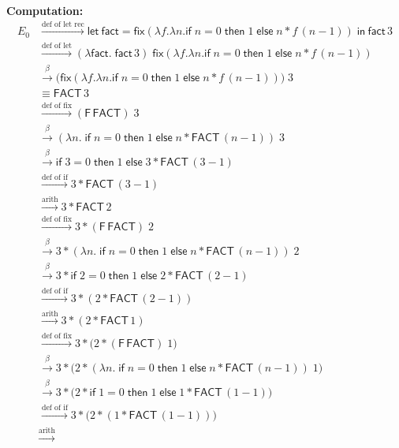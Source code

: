 \documentclass{article}
\theoremstyle{theorem}
\theoremstyle{definition}
\theoremstyle{remark}
\begin{document}
\textbf{Computation:} 
\begingroup
\setlength{\jot}{4pt}
\begin{align*}
E_0
&\xrightarrow{\text{def of let rec}}
\mathsf{let\ fact} = \mathsf{fix}(\lambda f.\lambda n.\mathsf{if}\;n=0\;\mathsf{then}\;1\;\mathsf{else}\;n * f\,(n-1))\;\mathsf{in\ fact}\,3\\
&\xrightarrow{\text{def of let}}
(\lambda \mathsf{fact}.\; \mathsf{fact}\,3)\; \mathsf{fix}(\lambda f.\lambda n.\mathsf{if}\;n=0\;\mathsf{then}\;1\;\mathsf{else}\;n * f\,(n-1))\\
&\xrightarrow{\beta}
\big(\mathsf{fix}(\lambda f.\lambda n.\mathsf{if}\;n=0\;\mathsf{then}\;1\;\mathsf{else}\;n * f\,(n-1))\big)\;3\\
&\equiv \mathsf{FACT}\,3\\
&\xrightarrow{\text{def of fix}}
(\mathsf{F}\,\mathsf{FACT})\;3\\
&\xrightarrow{\beta}
(\lambda n.\; \mathsf{if}\;n=0\;\mathsf{then}\;1\;\mathsf{else}\;n * \mathsf{FACT}\,(n-1))\;3\\
&\xrightarrow{\beta}
\mathsf{if}\;3=0\;\mathsf{then}\;1\;\mathsf{else}\;3 * \mathsf{FACT}\,(3-1)\\
&\xrightarrow{\text{def of if}}
3 * \mathsf{FACT}\,(3-1)\\
&\xrightarrow{\text{arith}}
3 * \mathsf{FACT}\,2\\[4pt]
&\xrightarrow{\text{def of fix}}
3 * (\mathsf{F}\,\mathsf{FACT})\;2\\
&\xrightarrow{\beta}
3 * (\lambda n.\; \mathsf{if}\;n=0\;\mathsf{then}\;1\;\mathsf{else}\;n * \mathsf{FACT}\,(n-1))\;2\\
&\xrightarrow{\beta}
3 * \mathsf{if}\;2=0\;\mathsf{then}\;1\;\mathsf{else}\;2 * \mathsf{FACT}\,(2-1)\\
&\xrightarrow{\text{def of if}}
3 * (2 * \mathsf{FACT}\,(2-1))\\
&\xrightarrow{\text{arith}}
3 * (2 * \mathsf{FACT}\,1)\\[4pt]
&\xrightarrow{\text{def of fix}}
3 * \big(2 * (\mathsf{F}\,\mathsf{FACT})\;1\big)\\
&\xrightarrow{\beta}
3 * \big(2 * (\lambda n.\; \mathsf{if}\;n=0\;\mathsf{then}\;1\;\mathsf{else}\;n * \mathsf{FACT}\,(n-1))\;1\big)\\
&\xrightarrow{\beta}
3 * \big(2 * \mathsf{if}\;1=0\;\mathsf{then}\;1\;\mathsf{else}\;1 * \mathsf{FACT}\,(1-1)\big)\\
&\xrightarrow{\text{def of if}}
3 * \big(2 * (1 * \mathsf{FACT}\,(1-1))\big)\\
&\xrightarrow{\text{arith}}

\end{align*}
\end{document}
